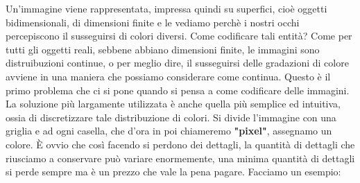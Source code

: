 \noindent
Un'immagine viene rappresentata, impressa quindi su superfici, cioè oggetti bidimensionali, di dimensioni finite e le vediamo perchè i nostri occhi percepiscono il susseguirsi di colori diversi. Come codificare tali entità?
Come per tutti gli oggetti reali, sebbene abbiano dimensioni finite, le immagini sono distruibuzioni continue, o per meglio dire, il susseguirsi delle gradazioni di colore avviene in una maniera che possiamo considerare come continua. Questo è il primo problema che ci si pone quando si pensa a come codificare delle immagini.\\
La soluzione più largamente utilizzata è anche quella più semplice ed intuitiva, ossia di discretizzare tale distribuzione di colori. Si divide l'immagine con una griglia e ad ogni casella, che d'ora in poi chiameremo \textbf{"pixel"}, assegnamo un colore.
\`E ovvio che così facendo si perdono dei dettagli, la quantità di dettagli che riusciamo a conservare può variare enormemente, una minima quantità di dettagli si perde sempre ma è un prezzo che vale la pena pagare.
\newpage
Facciamo un esempio:

